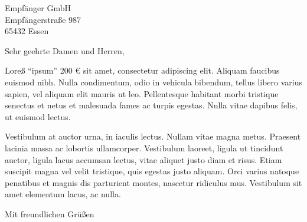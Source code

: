 \documentclass[
	fontsize=12pt,
	parskip=full,
	paper=A4,
	fromalign=right,
	fromphone=true,
	fromemail=true,
	foldmarks=true,
	version=last,
]{scrlttr2}
\begin{document}
\begin{letter}{
	Empfänger GmbH\\
	Empfängerstraße 987\\
	65432 Essen
}

\opening{Sehr geehrte Damen und Herren,}

Loreß "`ipsum"' 200 € sit amet, consectetur adipiscing elit. Aliquam faucibus euismod nibh. Nulla condimentum, odio in vehicula bibendum, tellus libero varius sapien, vel aliquam elit mauris ut leo. Pellentesque habitant morbi tristique senectus et netus et malesuada fames ac turpis egestas. Nulla vitae dapibus felis, ut euismod lectus.

Vestibulum at auctor urna, in iaculis lectus. Nullam vitae magna metus. Praesent lacinia massa ac lobortis ullamcorper. Vestibulum laoreet, ligula ut tincidunt auctor, ligula lacus accumsan lectus, vitae aliquet justo diam et risus. Etiam suscipit magna vel velit tristique, quis egestas justo aliquam. Orci varius natoque penatibus et magnis dis parturient montes, nascetur ridiculus mus. Vestibulum sit amet elementum lacus, ac nulla.


\closing{Mit freundlichen Grüßen}




\end{letter}

%
\end{document}

